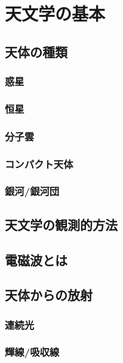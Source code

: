 \chapter{天文学の基本}
\label{chap:fandamentals_of_astronomy}

\section{天体の種類}

\subsection{惑星}

\subsection{恒星}

\subsection{分子雲}

\subsection{コンパクト天体}

\subsection{銀河/銀河団}


\section{天文学の観測的方法}

\section{電磁波とは}

\section{天体からの放射}

\subsection{連続光}

\subsection{輝線/吸収線}